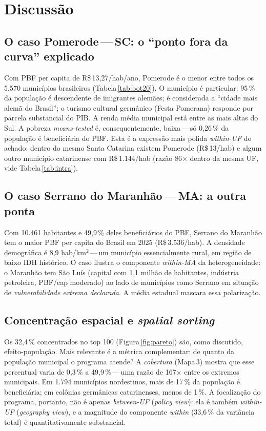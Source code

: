 \documentclass[12pt,a4paper,oneside]{article}
\newcommand{\rs}{R\$\,}
\begin{document}
\section{Discussão}\label{sec:discussao}

\subsection{O caso Pomerode\,---\,SC: o ``ponto fora da curva'' explicado}

Com PBF per capita de \rs 13{,}27/hab/ano, Pomerode é o menor entre todos
os 5.570 municípios brasileiros (Tabela\,\ref{tab:bot20}). O município é
particular: 95\,\% da população é descendente de imigrantes alemães; é
considerada a ``cidade mais alemã do Brasil''; o turismo cultural
germânico (Festa Pomerana) responde por parcela substancial do PIB. A
renda média municipal está entre as mais altas do Sul. A pobreza
\textit{means-tested} é, consequentemente, baixa\,---\,só 0{,}26\,\% da
população é beneficiária do PBF. Esta é a expressão mais polida
\textit{within-UF} do achado: dentro do mesmo Santa Catarina existem
Pomerode (\rs 13/hab) e algum outro município catarinense com \rs 1.144/hab
(razão 86$\times$ dentro da mesma UF, vide Tabela\,\ref{tab:intra}).

\subsection{O caso Serrano do Maranhão\,---\,MA: a outra ponta}

Com 10.461 habitantes e 49{,}9\,\% deles beneficiários do PBF, Serrano do
Maranhão tem o maior PBF per capita do Brasil em 2025 (\rs 3.536/hab). A
densidade demográfica é 8{,}9 hab/km$^2$\,---\,um município essencialmente
rural, em região de baixo IDH histórico. O caso ilustra o componente
\textit{within-MA} da heterogeneidade: o Maranhão tem São Luís (capital
com 1{,}1 milhão de habitantes, indústria petroleira, PBF/cap moderado)
ao lado de municípios como Serrano em situação de \textit{vulnerabilidade
extrema declarada}. A média estadual mascara essa polarização.

\subsection{Concentração espacial e \textit{spatial sorting}}

Os 32{,}4\,\% concentrados no top 100 (Figura\,\ref{fig:pareto}) são,
como discutido, efeito-população. Mais relevante é a métrica complementar:
de quanto da população municipal o programa atende?
A \textit{cobertura} (Mapa\,3) mostra que esse percentual varia de
0{,}3\,\% a 49{,}9\,\%\,---\,uma razão de 167$\times$ entre os extremos
municipais. Em 1.794 municípios nordestinos, mais de 17\,\% da
população é beneficiária; em colônias germânicas catarinenses, menos de
1\,\%. A focalização do programa, portanto, não é apenas \textit{between-UF}
(\textit{policy view}): ela é também \textit{within-UF} (\textit{geography
view}), e a magnitude do componente \textit{within} (33{,}6\,\% da variância
total) é quantitativamente substancial.
\end{document}
